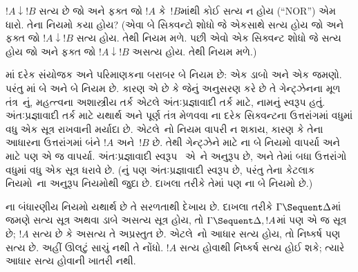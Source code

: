 \begin{prob}
$!A \downarrow !B$ સત્ય છે જો અને ફક્ત જો
$!A$ કે~$!B$માંથી કોઈ સત્ય ન હોય (``NOR'') એમ ધારો.
તેના  નિયમો કયા હોય?
(એવા બે સિક્વન્ટો શોધો જે એકસાથે સત્ય હોય
જો અને ફક્ત જો $!A \downarrow !B$ સત્ય હોય.
તેથી \RightR{\downarrow} નિયમ મળે.
પછી એવો એક સિક્વન્ટ શોધો જે સત્ય હોય
જો અને ફક્ત જો $!A \downarrow !B$ અસત્ય હોય.
તેથી \LeftR{\downarrow} નિયમ મળે.)
\end{prob}

માં દરેક સંયોજક અને પરિમાણકના બરાબર બે નિયમ છે:
એક ડાબો અને એક જમણો.
પરંતુ માં બે \LeftR{\land} અને બે \RightR{\lor} નિયમ છે.
કારણ એ છે કે  જેનું અનુસરણ કરે છે તે
ગેન્ટ્ઝેનના મૂળ તંત્ર~નું,
મહત્ત્વના અશાસ્ત્રીય તર્ક એટલે અંતઃપ્રજ્ઞાવાદી તર્ક માટે,
 નામનું સ્વરૂપ હતું.
અંતઃપ્રજ્ઞાવાદી તર્ક માટે યથાર્થ અને પૂર્ણ તંત્ર મેળવવા
ના દરેક સિક્વન્ટના ઉત્તરાંગમાં
વધુમાં વધુ એક સૂત્ર રાખવાની મર્યાદા છે.
એટલે~નો \RightR{\lor} નિયમ વાપરી ન શકાય,
કારણ કે તેના આધારના ઉત્તરાંગમાં બંને $!A$ અને~$!B$ છે.
તેથી ગેન્ટ્ઝેને  માટે \RightR{\lor}ના
બે નિયમો વાપર્યા અને  માટે પણ એ જ વાપર્યા.
અંતઃપ્રજ્ઞાવાદી સ્વરૂપ~ એ~ને અનુરૂપ છે,
અને તેમાં બધા ઉત્તરાંગો વધુમાં વધુ એક સૂત્ર ધરાવે છે.
(નું પણ અંતઃપ્રજ્ઞાવાદી સ્વરૂપ છે,
પરંતુ તેના કેટલાક નિયમો~ના અનુરૂપ નિયમોથી જુદા છે.
દાખલા તરીકે તેમાં પણ \RightR{\lor}ના બે નિયમો છે.)

ના બંધારણીય નિયમો યથાર્થ છે તે સરળતાથી દેખાય છે.
દાખલા તરીકે $\Gamma \Sequent \Delta$માં
જમણે સત્ય સૂત્ર અથવા ડાબે અસત્ય સૂત્ર હોય,
તો $\Gamma \Sequent \Delta, !A$માં પણ એ જ સૂત્ર છે;
$!A$ સત્ય છે કે અસત્ય તે અપ્રસ્તુત છે.
એટલે~\RightR{\Weakening}નો આધાર સત્ય હોય, તો નિષ્કર્ષ પણ સત્ય છે.
અહીં ઊલટું સાચું નથી તે નોંધો.
$!A$ સત્ય હોવાથી નિષ્કર્ષ સત્ય હોઈ શકે;
ત્યારે આધાર સત્ય હોવાની ખાતરી નથી.

